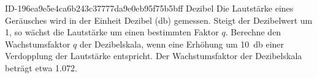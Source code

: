 \begin{exercise}
      {ID-196ea9e5e4ca6b243c37777da9e0eb95f75b5bff}
      {Dezibel}
  \ifproblem\problem
    Die Lautstärke eines Geräusches wird in der Einheit Dezibel (\si{\decibel})
    gemessen. Steigt der Dezibelwert um 1, so wächst die Lautstärke um einen
    bestimmten Faktor $q$. Berechne den Wachstumsfaktor $q$ der Dezibelskala,
    wenn eine Erhöhung um \SI{10}{\decibel} einer Verdopplung der Lautstärke
    entspricht.
  \fi
  \ifoutcome\outcome
    Der Wachstumsfaktor der Dezibelskala beträgt etwa \num{1.072}.
  \fi
\end{exercise}

